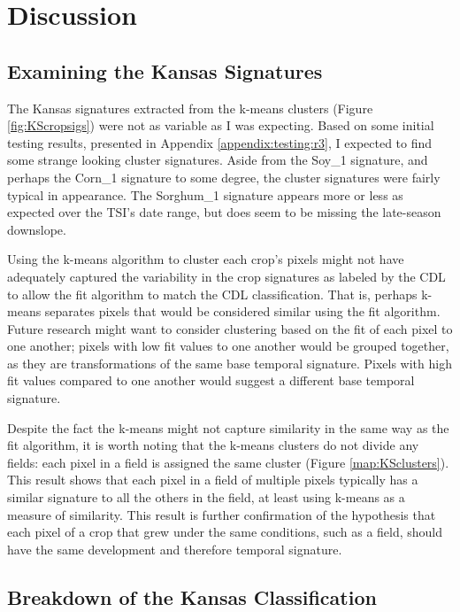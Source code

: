 \chapter{Discussion}

\section{Examining the Kansas Signatures}

The Kansas signatures extracted from the k-means clusters (Figure \ref{fig:KScropsigs}) were not as variable as I was expecting. Based on some initial testing results, presented in Appendix \ref{appendix:testing:r3}, I expected to find some strange looking cluster signatures. Aside from the Soy\_1 signature, and perhaps the Corn\_1 signature to some degree, the cluster signatures were fairly typical in appearance. The Sorghum\_1 signature appears more or less as expected over the TSI's date range, but does seem to be missing the late-season downslope.

Using the k-means algorithm to cluster each crop's pixels might not have adequately captured the variability in the crop signatures as labeled by the CDL to allow the fit algorithm to match the CDL classification. That is, perhaps k-means separates pixels that would be considered similar using the fit algorithm. Future research might want to consider clustering based on the fit of each pixel to one another; pixels with low fit values to one another would be grouped together, as they are transformations of the same base temporal signature. Pixels with high fit values compared to one another would suggest a different base temporal signature.

Despite the fact the k-means might not capture similarity in the same way as the fit algorithm, it is worth noting that the k-means clusters do not divide any fields: each pixel in a field is assigned the same cluster (Figure \ref{map:KSclusters}). This result shows that each pixel in a field of multiple pixels typically has a similar signature to all the others in the field, at least using k-means as a measure of similarity. This result is further confirmation of the hypothesis that each pixel of a crop that grew under the same conditions, such as a field, should have the same development and therefore temporal signature.

\section{Breakdown of the Kansas Classification}

